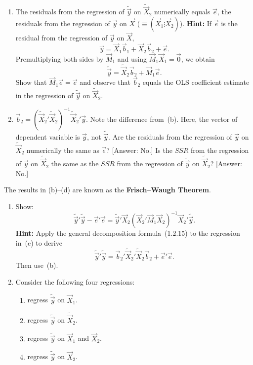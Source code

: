\begin{problemset}
\begin{enumerate}[label=(\alph*)]
\item The residuals from the regression of $\tilde{\vec{y}}$ on
$\widetilde{\vec{X}}_2$ numerically equals $\vec{e}$, the residuals from the
regression of $\vec{y}$ on $\vec{X}$ ($\equiv (\vec{X}_1 \vdots \vec{X}_2)$).
\textbf{Hint:} If $\vec{e}$ is the residual from the regression of $\vec{y}$
on $\vec{X}$,
%
\[
\vec{y} = \vec{X}_1 \vec{b}_1 + \vec{X}_2 \vec{b}_2 + \vec{e}.
\]
%
Premultiplying both sides by $\vec{M}_1$ and using
$\vec{M}_1\vec{X}_1 = \vec{0}$, we obtain
%
\[
\tilde{\vec{y}} = \widetilde{\vec{X}}_2 \vec{b}_2 + \vec{M}_1\vec{e}.
\]
%
Show that $\vec{M}_1\vec{e} = \vec{e}$ and observe that $\vec{b}_2$ equals the
OLS coefficient estimate in the regression of $\tilde{\vec{y}}$ on
$\widetilde{\vec{X}}_2$.

\item $\vec{b}_2 = (\widetilde{\vec{X}}_2'\widetilde{\vec{X}}_2)^{-1}
\widetilde{\vec{X}}_2'\vec{y}$.
Note the difference from~(b). Here, the vector of dependent variable is
$\vec{y}$, not $\tilde{\vec{y}}$. Are the residuals from the regression of
$\vec{y}$ on $\widetilde{\vec{X}}_2$ numerically the same as $\vec{e}$?
[Answer: No.]\enspace
Is the $SSR$ from the regression of $\vec{y}$ on $\widetilde{\vec{X}}_2$ the
same as the $SSR$ from the regression of $\tilde{\vec{y}}$ on
$\widetilde{\vec{X}}_2$? [Answer: No.]
\end{enumerate}

\noindent
The results in (b)--(d) are known as the \textbf{Frisch--Waugh Theorem}.

\begin{enumerate}[label=(\alph*),resume]
\item Show:
%
\[
\tilde{\vec{y}}'\tilde{\vec{y}} - \vec{e}'\vec{e}
= \tilde{\vec{y}}'\vec{X}_2(\vec{X}_2'\vec{M}_1\vec{X}_2)^{-1}\vec{X}_2'\tilde{\vec{y}}.
\]
%
\textbf{Hint:} Apply the general decomposition formula~(1.2.15) to the
regression in~(c) to derive
%
\[
\tilde{\vec{y}}'\tilde{\vec{y}}
= \vec{b}_2'\widetilde{\vec{X}}_2'\widetilde{\vec{X}}_2\vec{b}_2 + \vec{e}'\vec{e}.
\]
%
Then use~(b).

\item Consider the following four regressions:
\begin{enumerate}[label=(\arabic*)]
\item regress $\tilde{\vec{y}}$ on $\vec{X}_1$.
\item regress $\tilde{\vec{y}}$ on $\widetilde{\vec{X}}_2$.
\item regress $\tilde{\vec{y}}$ on $\vec{X}_1$ and $\vec{X}_2$.
\item regress $\tilde{\vec{y}}$ on $\vec{X}_2$.
\end{enumerate}


\end{enumerate}
\end{problemset}
